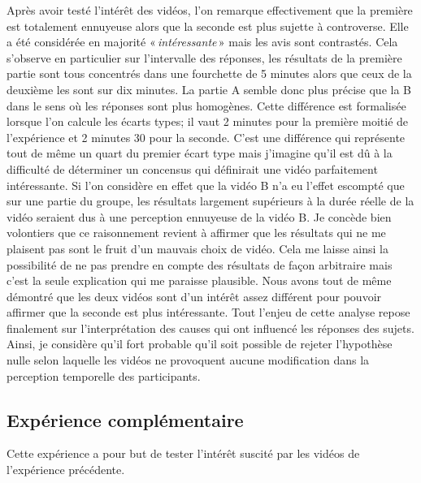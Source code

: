 \documentclass[12pt,fleqn,oneside,french,openany]{book} %
\begin{document}
Après avoir testé l'intérêt des vidéos, l'on remarque effectivement que la première est totalement ennuyeuse alors que la seconde est plus sujette à controverse. Elle a été considérée en majorité «\,\emph{intéressante}\,» mais les avis sont contrastés. Cela s'observe en particulier sur l'intervalle des réponses, les résultats de la première partie sont tous concentrés dans une fourchette de 5 minutes alors que ceux de la deuxième les sont sur dix minutes. La partie A semble donc plus précise que la B dans le sens où les réponses sont plus homogènes. Cette différence est formalisée lorsque l'on calcule les écarts types; il vaut 2 minutes pour la première moitié de l'expérience et 2 minutes 30 pour la seconde. C'est une différence qui représente tout de même un quart du premier écart type mais j'imagine qu'il est dû à la difficulté de déterminer un concensus qui définirait une vidéo parfaitement intéressante. Si l'on considère en effet que la vidéo B n'a eu l'effet escompté que sur une partie du groupe, les résultats largement supérieurs à la durée réelle de la vidéo seraient dus à une perception ennuyeuse de la vidéo B. Je concède bien volontiers que ce raisonnement revient à affirmer que les résultats qui ne me plaisent pas sont le fruit d'un mauvais choix de vidéo. Cela me laisse ainsi la possibilité de ne pas prendre en compte des résultats de façon arbitraire mais c'est la seule explication qui me paraisse plausible. Nous avons tout de même démontré que les deux vidéos sont d'un intérêt assez différent pour pouvoir affirmer que la seconde est plus intéressante. Tout l'enjeu de cette analyse repose finalement sur l'interprétation des causes qui ont influencé les réponses des sujets. Ainsi, je considère qu'il fort probable qu'il soit possible de rejeter l'hypothèse nulle selon laquelle les vidéos ne provoquent aucune modification dans la perception temporelle des participants.

\clearpage

\subsection{Expérience complémentaire} \label{ssec:exp1.2}
Cette expérience a pour but de tester l'intérêt suscité par les vidéos de l'expérience précédente. 
\end{document}
